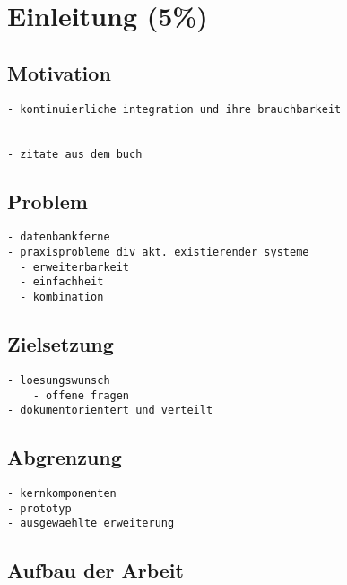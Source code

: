 \chapter{Einleitung (5\%) }

\section{Motivation}
\begin{verbatim}
- kontinuierliche integration und ihre brauchbarkeit


- zitate aus dem buch

\end{verbatim}

\section{Problem}

\begin{verbatim}
- datenbankferne
- praxisprobleme div akt. existierender systeme
  - erweiterbarkeit
  - einfachheit
  - kombination

\end{verbatim}

\section{Zielsetzung}

\begin{verbatim}
- loesungswunsch
    - offene fragen
- dokumentorientert und verteilt
\end{verbatim}

\section{Abgrenzung}

\begin{verbatim}
- kernkomponenten
- prototyp
- ausgewaehlte erweiterung

\end{verbatim}

\section{Aufbau der Arbeit}


